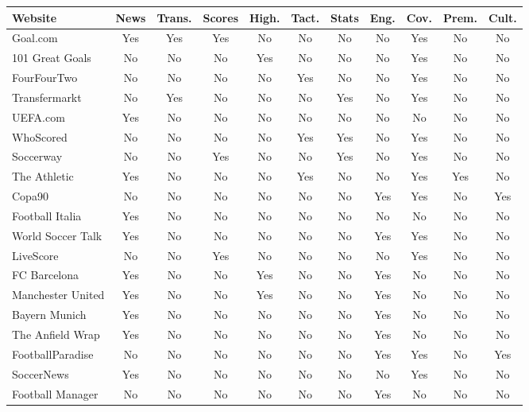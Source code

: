 \begin{table}[h!]
    \centering
    \label{tab:feature-comparison}
    \small %
    \begin{tabularx}{\textwidth}{|p{3cm}|c|c|c|c|c|c|c|c|c|c|}
    \hline
    \textbf{Website} & \textbf{News} & \textbf{Trans.} & \textbf{Scores} & \textbf{High.} & \textbf{Tact.} & \textbf{Stats} & \textbf{Eng.} & \textbf{Cov.} & \textbf{Prem.} & \textbf{Cult.} \\
    \hline
    Goal.com & Yes & Yes & Yes & No & No & No & No & Yes & No & No \\
    101 Great Goals & No & No & No & Yes & No & No & No & Yes & No & No \\
    FourFourTwo & No & No & No & No & Yes & No & No & Yes & No & No \\
    Transfermarkt & No & Yes & No & No & No & Yes & No & Yes & No & No \\
    UEFA.com & Yes & No & No & No & No & No & No & No & No & No \\
    WhoScored & No & No & No & No & Yes & Yes & No & Yes & No & No \\
    Soccerway & No & No & Yes & No & No & Yes & No & Yes & No & No \\
    The Athletic & Yes & No & No & No & Yes & No & No & Yes & Yes & No \\
    Copa90 & No & No & No & No & No & No & Yes & Yes & No & Yes \\
    Football Italia & Yes & No & No & No & No & No & No & No & No & No \\
    World Soccer Talk & Yes & No & No & No & No & No & Yes & Yes & No & No \\
    LiveScore & No & No & Yes & No & No & No & No & Yes & No & No \\
    FC Barcelona & Yes & No & No & Yes & No & No & Yes & No & No & No \\
    Manchester United & Yes & No & No & Yes & No & No & Yes & No & No & No \\
    Bayern Munich & Yes & No & No & No & No & No & Yes & No & No & No \\
    The Anfield Wrap & Yes & No & No & No & No & No & Yes & No & No & No \\
    FootballParadise & No & No & No & No & No & No & Yes & Yes & No & Yes \\
    SoccerNews & Yes & No & No & No & No & No & No & Yes & No & No \\
    Football Manager & No & No & No & No & No & No & Yes & No & No & No \\

\end{tabularx}
\end{table}
